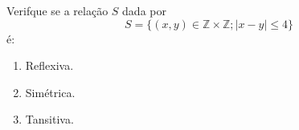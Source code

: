 \item Verifque se a relação $S$ dada por
\[S = \{(x,y)\in \mathbb{Z}\times \mathbb{Z};|x-y|\leq 4\}\]
é:
		\begin{enumerate}
				\item Reflexiva.
				\item Simétrica.
				\item Tansitiva.
		\end{enumerate}

